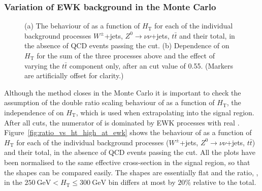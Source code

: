 \subsubsection{Variation of EWK background in the Monte Carlo}

\begin{figure}[!t]
  \begin{center} 
    \caption{\label{fig:ratio_vs_ht_ewk} (a) The behaviour of \RaT as
      a function of $H_{\mathrm{T}}$ for each of the individual
      background processes $W^{\pm}$+jets, $Z^{0}\rightarrow\nu\nu$+jets,
      $t\bar{t}$ and their total, in the absence of QCD events passing
      the \aT cut. (b) Dependence of \RaT on $H_{\mathrm{T}}$ for the
      sum of the three processes above and the effect of varying the
      $t\bar{t}$ component only, after an \aT cut value of 0.55.
      (Markers are artificially offset for clarity.)}
  \end{center}
\end{figure}

Although the method closes in the Monte Carlo it is important to check
the assumption of the double ratio scaling behaviour of \RaT as a
function of $H_{\mathrm{T}}$, \ie the independence of \RaT on
$H_{\mathrm{T}}$, which is used when extrapolating into the signal
region. After all cuts, the numerator of \RaT is dominated by EWK
processes with real \mymet.  Figure~\ref{fig:ratio_vs_ht_high_at_ewk}
shows the behaviour of \RaT as a function of $H_{\mathrm{T}}$ for each
of the individual background processes ($W^{\pm}$+jets,
$Z^{0}\rightarrow\nu\nu$+jets, $t\bar{t}$) and their total, in the
absence of QCD events passing the \aT cut. All the plots have been
normalised to the same effective cross-section in the signal region,
so that the shapes can be compared easily. The shapes are essentially
flat and the ratio, \RaT, in the $250~\mathrm{GeV} < H_{\mathrm{T}}
\leq 300~\mathrm{GeV}$ bin differs at most by $20\%$ relative to the
total.

